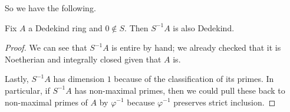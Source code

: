 So we have the following.
\begin{proposition}
    Fix $A$ a Dedekind ring and $0\notin S.$ Then $S^{-1}A$ is also Dedekind.
\end{proposition}
\begin{proof}
    We can see that $S^{-1}A$ is entire by hand; we already checked that it is Noetherian and integrally closed given that $A$ is.

    Lastly, $S^{-1}A$ has dimension $1$ because of the classification of its primes. In particular, if $S^{-1}A$ has non-maximal primes, then we could pull these back to non-maximal primes of $A$ by $\varphi^{-1}$ because $\varphi^{-1}$ preserves strict inclusion.
\end{proof}